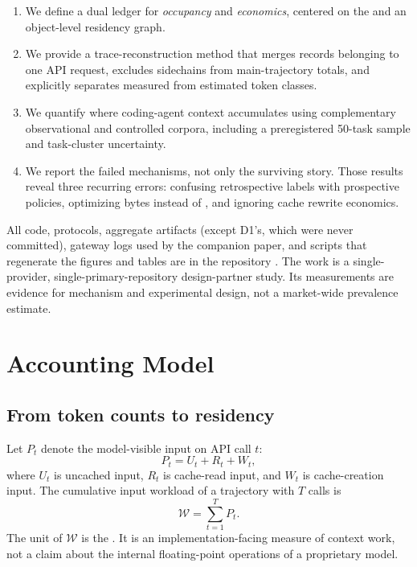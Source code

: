 \documentclass[10pt,twocolumn]{article}
\begin{document}
\begin{enumerate}
  \item We define a dual ledger for \emph{occupancy} and \emph{economics}, centered on the
  \tokensturn{} and an object-level residency graph.
  \item We provide a trace-reconstruction method that merges records belonging to one API request,
  excludes sidechains from main-trajectory totals, and explicitly separates measured from estimated
  token classes.
  \item We quantify where coding-agent context accumulates using complementary observational and
  controlled corpora, including a preregistered 50-task sample and task-cluster uncertainty.
  \item We report the failed mechanisms, not only the surviving story.  Those results reveal three
  recurring errors: confusing retrospective labels with prospective policies, optimizing bytes
  instead of \tokensturns, and ignoring cache rewrite economics.
\end{enumerate}

All code, protocols, aggregate artifacts (except D1's, which were never committed), gateway logs used
by the companion paper, and scripts that regenerate the figures and tables are in the repository
\cite{contextruntime2026}.  The work is a single-provider, single-primary-repository design-partner
study.  Its measurements are evidence for mechanism and experimental design, not a market-wide
prevalence estimate.

\section{Accounting Model}

\subsection{From token counts to residency}

Let $P_t$ denote the model-visible input on API call $t$:
\begin{equation}
P_t = U_t + R_t + W_t,
\end{equation}
where $U_t$ is uncached input, $R_t$ is cache-read input, and $W_t$ is cache-creation input.  The
cumulative input workload of a trajectory with $T$ calls is
\begin{equation}
\mathcal{W}=\sum_{t=1}^{T} P_t.
\end{equation}
The unit of $\mathcal{W}$ is the \tokensturn.  It is an implementation-facing measure of context
work, not a claim about the internal floating-point operations of a proprietary model.
\end{document}
